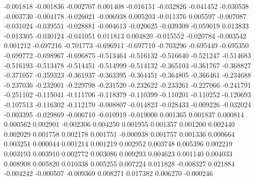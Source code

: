 -0.001818
-0.001836
-0.002707
0.001408
-0.016151
-0.032826
-0.041452
-0.030538
-0.003730
-0.004178
-0.026021
-0.006938
0.005203
-0.011376
0.005597
-0.007087
-0.031024
-0.039551
-0.028881
-0.004613
-0.020625
-0.039309
-0.059019
0.013833
-0.013305
-0.030124
-0.041051
0.011813
0.004820
-0.015552
-0.020784
-0.003542
0.001212
-0.697216
-0.701773
-0.696911
-0.697710
-0.703296
-0.695449
-0.695350
-0.699772
-0.698967
-0.696875
-0.513464
-0.516132
-0.516640
-0.521247
-0.514683
-0.516193
-0.513478
-0.514451
-0.514999
-0.514132
-0.365103
-0.361767
-0.368827
-0.371057
-0.359323
-0.361937
-0.363395
-0.364451
-0.364805
-0.366461
-0.234688
-0.237036
-0.232001
-0.229798
-0.231520
-0.232622
-0.233261
-0.227066
-0.241791
-0.251102
-0.115041
-0.111706
-0.118379
-0.110399
-0.110201
-0.110252
-0.120693
-0.107513
-0.116302
-0.112170
-0.008807
-0.014823
-0.028433
-0.009226
-0.032024
-0.003395
-0.029869
-0.006710
-0.010919
-0.019000
0.001365
0.001837
0.000814
0.000562
0.002901
-0.002306
0.004250
0.001955
0.001357
0.001200
0.002440
0.002029
0.001758
0.002178
0.001751
-0.000938
0.001757
0.001336
0.000664
0.003251
0.000044
0.001214
0.001219
0.002952
0.003748
0.005396
0.002219
0.003193
0.003910
0.002772
0.003086
0.009293
0.004623
0.001140
0.004033
0.008908
0.005820
0.010338
0.005255
0.007224
0.011828
-0.008327
0.021884
-0.004242
-0.000507
-0.009369
0.008271
0.017382
0.006270
-0.000246
